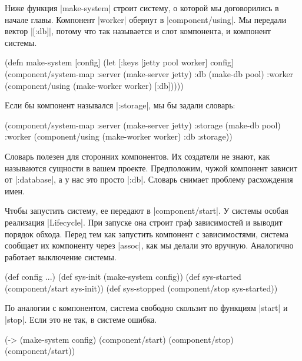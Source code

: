 Ниже функция \spverb|make-system| строит систему, о которой мы договорились в
начале главы. Компонент \spverb|worker| обернут в \spverb|component/using|. Мы
передали вектор \spverb|[:db]|, потому что так называется и слот компонента, и
компонент системы.

\begin{english}
  \begin{clojure}
(defn make-system
  [config]
  (let [{:keys [jetty pool worker]} config]
    (component/system-map
     :server (make-server jetty)
     :db     (make-db pool)
     :worker (component/using
              (make-worker worker) [:db]))))
  \end{clojure}
\end{english}

\noindent
Если бы компонент назывался \spverb|:storage|, мы бы задали словарь:

\begin{english}
  \begin{clojure}
(component/system-map
 :server  (make-server jetty)
 :storage (make-db pool)
 :worker  (component/using
           (make-worker worker) {:db :storage}))
  \end{clojure}
\end{english}

Словарь полезен для сторонних компонентов. Их создатели не знают, как называются
сущности в вашем проекте. Предположим, чужой компонент зависит от
\spverb|:database|, а у нас это просто \spverb|:db|. Словарь снимает проблему
расхождения имен.

Чтобы запустить систему, ее передают в \spverb|component/start|. У системы
особая реализация \spverb|Lifecycle|. При запуске она строит граф зависимостей и
выводит порядок обхода. Перед тем как запустить компонент с зависимостями,
система сообщает их компоненту через \spverb|assoc|, как мы делали это
вручную. Аналогично работает выключение системы.

\begin{english}
  \begin{clojure}
(def config {...})
(def sys-init (make-system config))
(def sys-started (component/start sys-init))
(def sys-stopped (component/stop sys-started))
  \end{clojure}
\end{english}

По аналогии с компонентом, система свободно скользит по функциям \spverb|start|
и \spverb|stop|. Если это не так, в системе ошибка.

\begin{english}
  \begin{clojure}
(-> (make-system config)
    (component/start)
    (component/stop)
    (component/start))
  \end{clojure}
\end{english}

